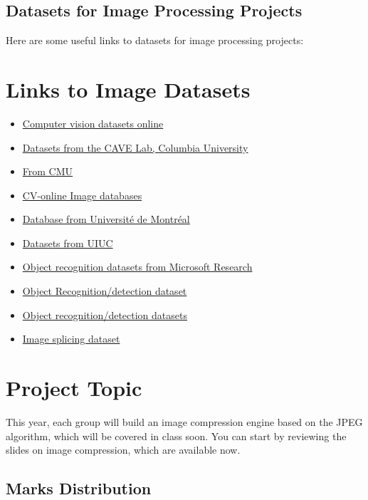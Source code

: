 \documentclass[11pt]{article}
\begin{document}
\subsection*{Datasets for Image Processing Projects}

Here are some useful links to datasets for image processing projects:
\section*{Links to Image Datasets}
\begin{itemize}
    \item \href{http://www.cvpapers.com/datasets.html}{Computer vision datasets online}
    \item \href{http://www.cs.columbia.edu/CAVE/databases/}{Datasets from the CAVE Lab, Columbia University}
    \item \href{http://www.cs.cmu.edu/~cil/v-images.html}{From CMU}
    \item \href{http://homepages.inf.ed.ac.uk/rbf/CVonline/Imagedbase.htm}{CV-online Image databases}
    \item \href{http://www.iro.umontreal.ca/~mignotte/TestImages.html}{Database from Université de Montréal}
    \item \href{http://www-cvr.ai.uiuc.edu/ponce_grp/data/}{Datasets from UIUC}
    \item \href{http://research.microsoft.com/en-us/projects/objectclassrecognition/}{Object recognition datasets from Microsoft Research}
    \item \href{http://www.vision.caltech.edu/Image_Datasets/Caltech101/}{Object Recognition/detection dataset}
    \item \href{http://www.cs.utexas.edu/~grauman/courses/spring2008/datasets.htm}{Object recognition/detection datasets}
    \item \href{http://www.ee.columbia.edu/ln/dvmm/downloads/authsplcuncmp/}{Image splicing dataset}
\end{itemize}


\section*{Project Topic}

This year, each group will build an image compression engine based on the JPEG algorithm, which will be covered in class soon. You can start by reviewing the slides on image compression, which are available now. 

\subsection*{Marks Distribution}
\end{document}
